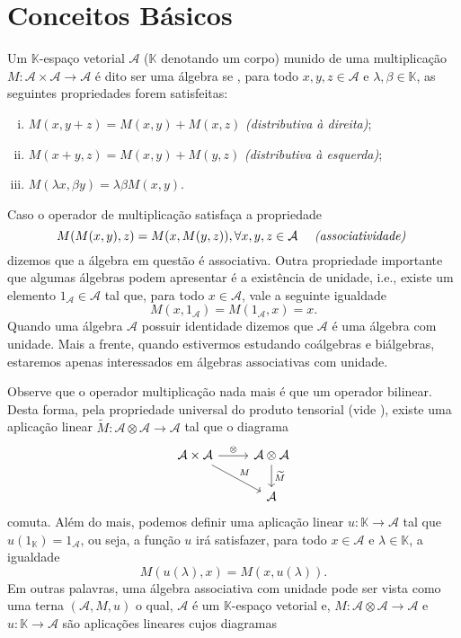 \documentclass[twoside,openright,titlepage,numbers=noenddot,headinclude,  lineheaders footinclude=true,cleardoublepage=empty,
                                BCOR=5mm,paper=a4,fontsize=12pt ]{scrbook}
\theoremstyle{definition}
\begin{document}
\section{Conceitos B\'asicos}
Um $\mathbb{K}$-espaço vetorial $\mathcal{A}$ ($\mathbb{K}$ denotando um corpo) 
munido de uma multiplicação $M: \mathcal{A} \times \mathcal{A} \rightarrow \mathcal{A}$ é dito ser uma álgebra
se , para todo $x, y, z \in \mathcal{A}$ e $\lambda, \beta \in \mathbb{K}$, as seguintes propriedades forem satisfeitas:
\begin{enumerate}[(i)]
    \item $M(x, y + z) = M(x, y) + M(x, z)$ \textit{(distributiva à direita)};
    \item $M(x + y, z) = M(x, y) + M(y, z)$ \textit{(distributiva à esquerda)};
    \item $M( \lambda x, \beta y) = \lambda \beta M(x,y)$.
\end{enumerate} 
Caso o operador de multiplicação satisfaça a propriedade
\[ M( M(x, y), z) = M(x, M(y, z)), \forall x, y, z \in \mathcal{A} \quad \text{ \textit{(associatividade)} }\]
dizemos que a álgebra em questão é associativa. Outra propriedade importante que algumas álgebras
podem apresentar é a existência de unidade, i.e., existe um elemento $1_{\mathcal{A}} \in \mathcal{A}$ tal que,
para todo $x \in \mathcal{A}$, vale a seguinte igualdade
\[ M(x, 1_{\mathcal{A}}) = M(1_{\mathcal{A}}, x) = x. \] 
Quando uma álgebra $\mathcal{A}$ possuir identidade dizemos que  $\mathcal{A}$ é uma 
álgebra com unidade. Mais a frente, quando estivermos 
estudando coálgebras e biálgebras, estaremos apenas interessados em álgebras associativas com unidade.

Observe que o operador multiplicação nada mais é que um operador bilinear. Desta forma, pela propriedade
universal do produto tensorial (vide \cite{tensor}), existe uma aplicação linear 
$\widetilde{M}:\mathcal{A} \otimes \mathcal{A} \rightarrow \mathcal{A}$ tal que o diagrama
\begin{displaymath}
\begin{tikzcd}
    \mathcal{A} \times \mathcal{A} \arrow{rd }{M} \arrow{r}{ \otimes} & \mathcal{A} \otimes \mathcal{A}
    \arrow{d} {\widetilde{M}} \\
    & \mathcal{A}
\end{tikzcd}
\end{displaymath}
comuta. Além do mais, podemos definir uma aplicação linear $u: \mathbb{K} \rightarrow \mathcal{A}$ tal que
$u( 1_{ \mathbb{K} }) = 1_{ \mathcal{A} }$, ou seja, a função $u$ irá satisfazer, para todo $x \in \mathcal{A} $
e $\lambda \in \mathbb{K}$, a igualdade
\[ M(u(\lambda), x) = M(x, u(\lambda)). \]
Em outras palavras, uma álgebra associativa com unidade pode ser vista como uma terna $(\mathcal{A}, M, u)$
o qual, $\mathcal{A}$ é um $\mathbb{K}$-espaço vetorial e, $M:\mathcal{A} \otimes \mathcal{A} \rightarrow \mathcal{A} $ e
$u: \mathbb{K} \rightarrow \mathcal{A} $ são aplicações lineares cujos
diagramas 
\end{document}
